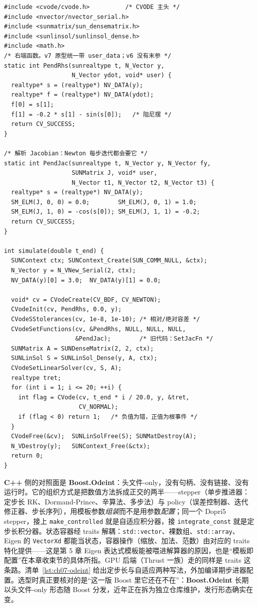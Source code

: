 \documentclass[12pt,a4paper,fontset=fandol]{ctexbook}
\newcommand{\Tp}[1]{\texttt{#1}}
\newcommand{\Bk}{\allowbreak}
\newcommand{\Lib}[1]{\textbf{#1}}
\newcommand{\Lang}[1]{\textsf{\bfseries #1}}
\newcommand{\CL}{\Lang{C}}
\newcommand{\CPP}{\Lang{C++}}
\begin{document}
\begin{lstlisting}[style=cstyle,caption={\CL{} 用 CVODE（按 SUNDIALS v7 新 API 读；v6 少 \Tp{SUNContext}）},label={lst:ch07-cvode}]
#include <cvode/cvode.h>          /* CVODE 主头 */
#include <nvector/nvector_serial.h>
#include <sunmatrix/sun_densematrix.h>
#include <sunlinsol/sunlinsol_dense.h>
#include <math.h>
/* 右端函数。v7 原型统一带 user_data；v6 没有末参 */
static int PendRhs(sunrealtype t, N_Vector y,
                   N_Vector ydot, void* user) {
  realtype* s = (realtype*) NV_DATA(y);
  realtype* f = (realtype*) NV_DATA(ydot);
  f[0] = s[1];
  f[1] = -0.2 * s[1] - sin(s[0]);   /* 阻尼摆 */
  return CV_SUCCESS;
}

/* 解析 Jacobian：Newton 每步迭代都会要它 */
static int PendJac(sunrealtype t, N_Vector y, N_Vector fy,
                   SUNMatrix J, void* user,
                   N_Vector t1, N_Vector t2, N_Vector t3) {
  realtype* s = (realtype*) NV_DATA(y);
  SM_ELM(J, 0, 0) = 0.0;        SM_ELM(J, 0, 1) = 1.0;
  SM_ELM(J, 1, 0) = -cos(s[0]); SM_ELM(J, 1, 1) = -0.2;
  return CV_SUCCESS;
}

int simulate(double t_end) {
  SUNContext ctx; SUNContext_Create(SUN_COMM_NULL, &ctx);
  N_Vector y = N_VNew_Serial(2, ctx);
  NV_DATA(y)[0] = 3.0;  NV_DATA(y)[1] = 0.0;

  void* cv = CVodeCreate(CV_BDF, CV_NEWTON);
  CVodeInit(cv, PendRhs, 0.0, y);
  CVodeSStolerances(cv, 1e-8, 1e-10); /* 相对/绝对容差 */
  CVodeSetFunctions(cv, &PendRhs, NULL, NULL, NULL,
                    &PendJac);        /* 旧代码：SetJacFn */
  SUNMatrix A = SUNDenseMatrix(2, 2, ctx);
  SUNLinSol S = SUNLinSol_Dense(y, A, ctx);
  CVodeSetLinearSolver(cv, S, A);
  realtype tret;
  for (int i = 1; i <= 20; ++i) {
    int flag = CVode(cv, t_end * i / 20.0, y, &tret,
                     CV_NORMAL);
    if (flag < 0) return 1;   /* 负值为错，正值为根事件 */
  }
  CVodeFree(&cv);  SUNLinSolFree(S); SUNMatDestroy(A);
  N_VDestroy(y);   SUNContext_Free(&ctx);
  return 0;
}
\end{lstlisting}

\CPP{} 侧的对照面是 \Lib{Boost.Odeint}：头文件-only，没有句柄、没有链接、没有运行时。它的组织方式是把数值方法拆成正交的两半——stepper（单步推进器：定步长 RK、Dormand-Prince、辛算法、多步法）与 policy（误差控制器、迭代修正器、步长序列），用模板参数\emph{组装}而不是用参数\emph{配置}；同一个 Dopri5 stepper，接上 \Tp{make\_controlled} \Bk{} 就是自适应积分器，接 \Tp{integrate\_const} 就是定步长积分器。状态容器经 traits 解耦：\Tp{std::vector}、裸数组、\Tp{std::array}、Eigen 的 \Tp{VectorXd} 都能当状态，容器操作（缩放、加法、范数）由对应的 traits 特化提供——这是第 5 章 Eigen 表达式模板能被喂进解算器的原因，也是``模板即配置''在本章收束节的具体所指。GPU 后端（Thrust 一族）走的同样是 traits 这条路。清单~\ref{lst:ch07-odeint} 给出定步长与自适应两种写法，外加编译期步进器配置。选型时真正要核对的是``这一版 Boost 里它还在不在''：\Lib{Boost.Odeint} 长期以头文件-only 形态随 Boost 分发，近年正在拆为独立仓库维护，发行形态确实在变。
\end{document}
